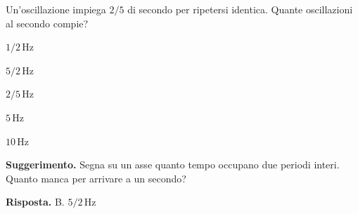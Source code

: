 \documentclass[11pt,a4paper]{article}
\begin{document}
\newpage
\begin{samepage}
\par\smallskip
Un’oscillazione impiega \(2/5\) di secondo per ripetersi identica. Quante oscillazioni al secondo compie?\par


\begin{list}{}{\setlength{\leftmargin}{1.4em}\setlength{\itemsep}{.1em}\setlength{\parsep}{0pt}}\small
\item[A.] \(1/2\,\mathrm{Hz}\)
\item[B.] \(5/2\,\mathrm{Hz}\)
\item[C.] \(2/5\,\mathrm{Hz}\)
\item[D.] \(5\,\mathrm{Hz}\)
\item[E.] \(10\,\mathrm{Hz}\)
\end{list}
{\small\textbf{Suggerimento.} Segna su un asse quanto tempo occupano due periodi interi. Quanto manca per arrivare a un secondo?\par}
\medskip\noindent\textbf{Risposta.} B. \(5/2\,\mathrm{Hz}\)\par


\end{samepage}
\end{document}
